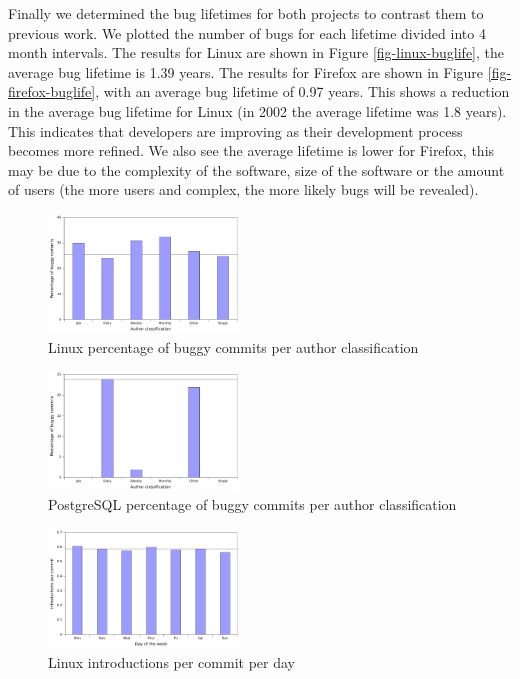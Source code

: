 Finally we determined the bug lifetimes for both projects to contrast
them to previous work. We plotted the number of bugs for each lifetime
divided into 4 month intervals. The results for Linux are shown in
Figure \ref{fig-linux-buglife}, the average bug lifetime is 1.39
years. The results for Firefox are shown in Figure
\ref{fig-firefox-buglife}, with an average bug lifetime of 0.97
years. This shows a reduction in the average bug lifetime for Linux (in
2002 the average lifetime was 1.8 years). This indicates that
developers are improving as their development process becomes more
refined. We also see the average lifetime is lower for Firefox, this
may be due to the complexity of the software, size of the software or
the amount of users (the more users and complex, the more likely bugs will be
revealed).


\begin{figure}
\begin{center}
\includegraphics[width=0.45\textwidth]{linux-bugginess-author-class.pdf}
\end{center}
\caption{Linux percentage of buggy commits per author classification}
\label{fig-linux-bugginess-author-class}
\end{figure}

\begin{figure}
\begin{center}
\includegraphics[width=0.45\textwidth]{postgresql-bugginess-author-class.pdf}
\end{center}
\caption{PostgreSQL percentage of buggy commits per author classification}
\label{fig-postgresql-bugginess-author-class}
\end{figure}


\begin{figure}
\begin{center}
\includegraphics[width=0.45\textwidth]{linux-introductions-day.pdf}
\end{center}
\caption{Linux introductions per commit per day}
\label{fig-linux-introductions-day}
\end{figure}

